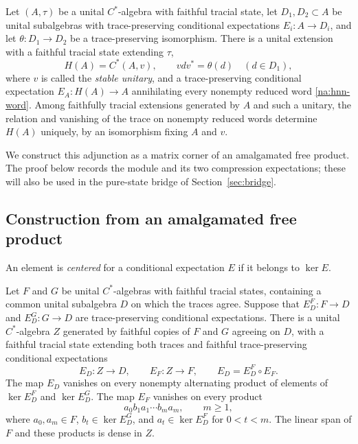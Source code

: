 \begin{proposition}\label{na:hnn}
Let $(A,\tau)$ be a unital $C^*$-algebra with faithful tracial state,
let $D_1,D_2\subset A$ be unital subalgebras with trace-preserving
conditional expectations $E_i:A\to D_i$, and let
$\theta:D_1\to D_2$ be a trace-preserving isomorphism.  There is a
unital extension with a faithful tracial state extending $\tau$,
\[
 H(A)=C^*(A,v),\qquad vdv^*=\theta(d)\quad(d\in D_1),
\]
where $v$ is called the \emph{stable unitary}, and a trace-preserving
conditional expectation $E_A:H(A)\to A$
annihilating every nonempty reduced word
\eqref{na:hnn-word}.  Among faithfully tracial extensions generated by
$A$ and such a unitary, the relation and vanishing of the trace on
nonempty reduced words determine $H(A)$ uniquely, by an isomorphism
fixing $A$ and $v$.
\end{proposition}

We construct this adjunction as a matrix corner of an amalgamated free product.
The proof below records the module and its two compression expectations;
these will also be used in the pure-state bridge of Section~\ref{sec:bridge}.

\subsection{Construction from an amalgamated free product}

An element is \emph{centered} for a conditional expectation $E$ if it
belongs to $\ker E$.

\begin{lemma}\label{na:free-product}
Let $F$ and $G$ be unital $C^*$-algebras with faithful tracial states,
containing a common unital subalgebra $D$ on which the traces agree.
Suppose that $E_D^F:F\to D$ and $E_D^G:G\to D$ are trace-preserving
conditional expectations.  There is a unital $C^*$-algebra $Z$ generated
by faithful copies of $F$ and $G$ agreeing on $D$, with a faithful
tracial state extending both traces and faithful trace-preserving conditional
expectations
\[
 E_D:Z\longrightarrow D,
 \qquad E_F:Z\longrightarrow F,
 \qquad E_D=E_D^F\circ E_F.
\]
The map $E_D$ vanishes on every nonempty alternating product of elements
of $\ker E_D^F$ and $\ker E_D^G$.  The map $E_F$ vanishes on every product
\begin{equation}\label{na:free-core}
 a_0 b_1 a_1\cdots b_m a_m,
 \qquad m\geq1,
\end{equation}
where $a_0,a_m\in F$, $b_t\in\ker E_D^G$, and
$a_t\in\ker E_D^F$ for $0<t<m$.  The linear span of $F$ and these
products is dense in $Z$.
\end{lemma}


